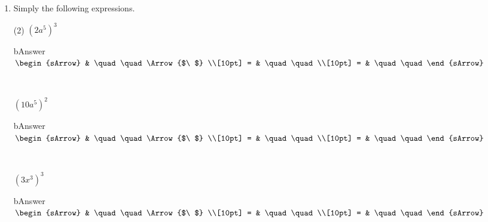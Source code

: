 \clearpage%



\begin{enumerate}
  \item Simply the following expressions.
  \begin{subtask}(2)
    \task[] $ (2a^5)^3  $
              \begin{envOut}[equal height group=A-Rev-1]{bAnswer}
			       $\begin{sArrow}
			             & \quad\quad       \Arrow{$\ $} \\[10pt]
                       = & \quad\quad               \\[10pt]      
					   = & \quad\quad  
	                \end{sArrow}$
              \end{envOut}
			  \begin{shortsolution}  
			     $ \quad \quad \quad \quad$
			\end{shortsolution}	

    \task[] $ (10a^5)^2  $
              \begin{envOut}[equal height group=A-Rev-1]{bAnswer}
			       $\begin{sArrow}
			             & \quad\quad       \Arrow{$\ $} \\[10pt]
                       = & \quad\quad               \\[10pt]      
					   = & \quad\quad  
	                \end{sArrow}$
              \end{envOut}
			  \begin{shortsolution}  
			     $ \quad \quad \quad \quad$
			\end{shortsolution}	


    \task[] $ (3x^3)^3  $
              \begin{envOut}[equal height group=A-Rev-1]{bAnswer}
			       $\begin{sArrow}
			             & \quad\quad       \Arrow{$\ $} \\[10pt]
                       = & \quad\quad               \\[10pt]      
					   = & \quad\quad  
	                \end{sArrow}$
              \end{envOut}
			  \begin{shortsolution}  
			     $ \quad \quad \quad \quad$
			\end{shortsolution}	


\end{subtask}
\end{enumerate}
